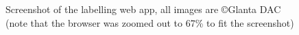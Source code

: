     \begin{figure}[h]
        \centering
        \caption{Screenshot of the labelling web app, all images are \copyright \space Glanta DAC (note that the browser was zoomed out to 67\% to fit the screenshot)}
        \label{fig:markupscreenshot}
    \end{figure}

